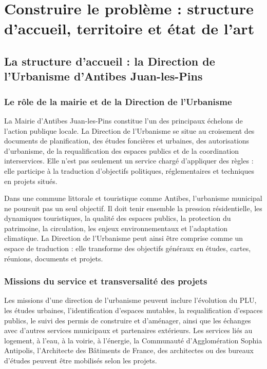 \documentclass[11pt,a4paper]{report}
\begin{document}
\chapter{Construire le problème : structure d'accueil, territoire et état de l'art}

\section{La structure d'accueil : la Direction de l'Urbanisme d'Antibes Juan-les-Pins}

\subsection{Le rôle de la mairie et de la Direction de l'Urbanisme}

La Mairie d'Antibes Juan-les-Pins constitue l'un des principaux échelons de l'action publique locale. La Direction de l'Urbanisme se situe au croisement des documents de planification, des études foncières et urbaines, des autorisations d'urbanisme, de la requalification des espaces publics et de la coordination interservices. Elle n'est pas seulement un service chargé d'appliquer des règles : elle participe à la traduction d'objectifs politiques, réglementaires et techniques en projets situés.

Dans une commune littorale et touristique comme Antibes, l'urbanisme municipal ne poursuit pas un seul objectif. Il doit tenir ensemble la pression résidentielle, les dynamiques touristiques, la qualité des espaces publics, la protection du patrimoine, la circulation, les enjeux environnementaux et l'adaptation climatique. La Direction de l'Urbanisme peut ainsi être comprise comme un espace de traduction : elle transforme des objectifs généraux en études, cartes, réunions, documents et projets.

\subsection{Missions du service et transversalité des projets}

Les missions d'une direction de l'urbanisme peuvent inclure l'évolution du PLU, les études urbaines, l'identification d'espaces mutables, la requalification d'espaces publics, le suivi des permis de construire et d'aménager, ainsi que les échanges avec d'autres services municipaux et partenaires extérieurs. Les services liés au logement, à l'eau, à la voirie, à l'énergie, la Communauté d'Agglomération Sophia Antipolis, l'Architecte des Bâtiments de France, des architectes ou des bureaux d'études peuvent être mobilisés selon les projets.
\end{document}
